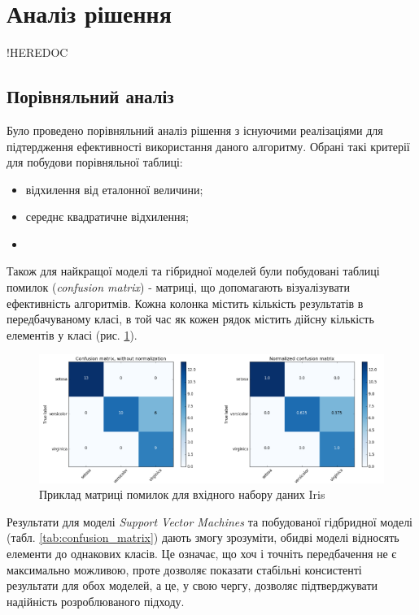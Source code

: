 \section{Аналіз рішення}
!HEREDOC

\subsection{Порівняльний аналіз}
Було проведено порівняльний аналіз рішення з існуючими реалізаціями для підтердження ефективності використання даного алгоритму. Обрані такі критерії для побудови порівняльної таблиці:

\begin{itemize}
	\item відхилення від еталонної величини;
	\item середнє квадратичне відхилення;
	\item 
\end{itemize}


Також для найкращої моделі та гібридної моделей були побудовані таблиці помилок (\textit{confusion matrix}) - матриці, що допомагають візуалізувати ефективність алгоритмів. Кожна колонка містить кількість результатів в передбачуваному класі, в той час як кожен рядок містить дійсну кількість елементів у класі (рис. \ref{fig:confusion_matrix}).

\begin{figure}[h!]
  \includegraphics[width=\linewidth]{figures/confusion_matrix.png}
  \caption{Приклад матриці помилок для вхідного набору даних Iris}
  \label{fig:confusion_matrix}
\end{figure}

Результати для моделі \textit{Support Vector Machines} та побудованої гідбридної моделі (табл. \ref{tab:confusion_matrix}) дають змогу зрозуміти, обидві моделі відносять елементи до однакових класів. Це означає, що хоч і точніть передбачення не є максимально можливою, проте дозволяє показати стабільні консистенті результати для обох моделей, а це, у свою чергу, дозволяє підтверджувати надійність розроблюваного підходу.

